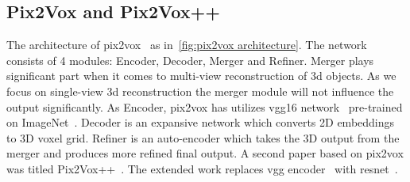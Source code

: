 \subsection{Pix2Vox and Pix2Vox++}\label{subsec:pix2vox-and-pix2vox++}
The architecture of pix2vox~\cite{Xie_2019} as in~\ref{fig:pix2vox architecture}.
The network consists of 4 modules: Encoder, Decoder, Merger and Refiner.
Merger plays significant part when it comes to multi-view reconstruction of 3d objects.
As we focus on single-view 3d reconstruction the merger module will not influence the output significantly.
As Encoder, pix2vox has utilizes \gls{vgg}16 network~\cite{simonyan2015deep} pre-trained on ImageNet~\cite{Deng2009ImageNetAL}.
Decoder is an expansive network which converts 2D embeddings to 3D voxel grid.
Refiner is an auto-encoder which takes the 3D output from the merger and produces more refined final output.
A second paper based on pix2vox was titled Pix2Vox++~\cite{Xie_2020}.
The extended work replaces \gls{vgg} encoder~\cite{simonyan2015deep} with \gls{resnet}~\cite{He2016DeepRL}.

